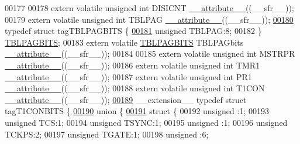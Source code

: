 \begin{DoxyCode}
00177 
00178 \textcolor{keyword}{extern} \textcolor{keyword}{volatile} \textcolor{keywordtype}{unsigned} \textcolor{keywordtype}{int}  DISICNT \hyperlink{a00009_a493c46f03454991ccc5aa7a6e1dfb2a7}{\_\_attribute\_\_}((\_\_sfr\_\_));
00179 \textcolor{keyword}{extern} \textcolor{keyword}{volatile} \textcolor{keywordtype}{unsigned} \textcolor{keywordtype}{int}  TBLPAG \hyperlink{a00009_a493c46f03454991ccc5aa7a6e1dfb2a7}{\_\_attribute\_\_}((\_\_sfr\_\_));
\hypertarget{a00009_source_l00180}{}\hyperlink{a00008}{00180} \textcolor{keyword}{typedef} \textcolor{keyword}{struct }tagTBLPAGBITS \{
\hypertarget{a00009_source_l00181}{}\hyperlink{a00008_a1d6a5ab1df407eb42a7e8453a04ec921}{00181}   \textcolor{keywordtype}{unsigned} TBLPAG:8;
00182 \} \hyperlink{a00008_d5/d72/a00803}{TBLPAGBITS};
00183 \textcolor{keyword}{extern} \textcolor{keyword}{volatile} \hyperlink{a00008_d5/d72/a00803}{TBLPAGBITS} TBLPAGbits \hyperlink{a00009_a493c46f03454991ccc5aa7a6e1dfb2a7}{\_\_attribute\_\_}((\_\_sfr\_\_));
00184 
00185 \textcolor{keyword}{extern} \textcolor{keyword}{volatile} \textcolor{keywordtype}{unsigned} \textcolor{keywordtype}{int}  MSTRPR \hyperlink{a00009_a493c46f03454991ccc5aa7a6e1dfb2a7}{\_\_attribute\_\_}((\_\_sfr\_\_));
00186 \textcolor{keyword}{extern} \textcolor{keyword}{volatile} \textcolor{keywordtype}{unsigned} \textcolor{keywordtype}{int}  TMR1 \hyperlink{a00009_a493c46f03454991ccc5aa7a6e1dfb2a7}{\_\_attribute\_\_}((\_\_sfr\_\_));
00187 \textcolor{keyword}{extern} \textcolor{keyword}{volatile} \textcolor{keywordtype}{unsigned} \textcolor{keywordtype}{int}  PR1 \hyperlink{a00009_a493c46f03454991ccc5aa7a6e1dfb2a7}{\_\_attribute\_\_}((\_\_sfr\_\_));
00188 \textcolor{keyword}{extern} \textcolor{keyword}{volatile} \textcolor{keywordtype}{unsigned} \textcolor{keywordtype}{int}  T1CON \hyperlink{a00009_a493c46f03454991ccc5aa7a6e1dfb2a7}{\_\_attribute\_\_}((\_\_sfr\_\_));
\hypertarget{a00009_source_l00189}{}\hyperlink{a00008}{00189} \_\_extension\_\_ \textcolor{keyword}{typedef} \textcolor{keyword}{struct }tagT1CONBITS \{
\hypertarget{a00009_source_l00190}{}\hyperlink{a00009}{00190}   \textcolor{keyword}{union }\{
\hypertarget{a00009_source_l00191}{}\hyperlink{a00009}{00191}     \textcolor{keyword}{struct }\{
00192       \textcolor{keywordtype}{unsigned} :1;
00193       \textcolor{keywordtype}{unsigned} TCS:1;
00194       \textcolor{keywordtype}{unsigned} TSYNC:1;
00195       \textcolor{keywordtype}{unsigned} :1;
00196       \textcolor{keywordtype}{unsigned} TCKPS:2;
00197       \textcolor{keywordtype}{unsigned} TGATE:1;
00198       \textcolor{keywordtype}{unsigned} :6;

\end{DoxyCode}
